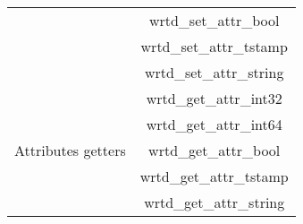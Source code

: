 \begin{table}
\begin{tabular}{cc}
& wrtd\_set\_attr\_bool \\                                                     
& wrtd\_set\_attr\_tstamp \\                                                   
& wrtd\_set\_attr\_string \\   
\hline
\multirow{5}{*}{Attributes getters} 
& wrtd\_get\_attr\_int32 \\                                                       
& wrtd\_get\_attr\_int64 \\                                                    
& wrtd\_get\_attr\_bool \\                                                        
& wrtd\_get\_attr\_tstamp \\                                                      
& wrtd\_get\_attr\_string \\   
\end{tabular}
\label{tab:wrtd_api}
\end{table}